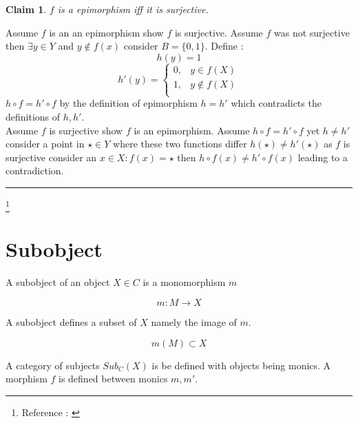 \documentclass[twoside]{article}
\newtheorem{claim}[theorem]{Claim}
\newenvironment{proof}{{\bf Proof:}}{\hfill\rule{2mm}{2mm}}
\begin{document}
\begin{figure}[H]
       \centering
{}
\end{figure}

\begin{claim}
  $f$ is a epimorphism iff it is surjective.
\end{claim}

\begin{proof}
  Assume $f$ is an an epimorphism show $f$ is surjective.  Assume $f$ was
  not surjective then $\exists y \in Y$ and $y \notin f(x)$ consider $B = \{ 0,1 \}$.
  Define :
  $$h(y)=1$$
  $$h'(y)=
  \begin{cases}
    0, & y \in f(X) \\
    1, & y \notin f(X) \\
  \end{cases}$$
  $h \circ f = h' \circ f$ by the definition of epimorphism $h = h'$ which contradicts
  the definitions of $h,h'$.\\

  Assume $f$ is surjective show $f$ is an epimorphism.  Assume $h \circ f = h' \circ f$
  yet $h \neq h'$ consider a point in $\star \in Y$ where these two functions differ
  $h(\star) \neq h'(\star)$ as $f$ is surjective consider an $x \in X : f(x) = \star$
  then $h \circ f(x) \neq h' \circ f(x)$ leading to a contradiction.
\end{proof}


\footnote{ Reference : \cite[Chapter~1.2]{popescu2012theory} \cite[p.~104]{spivak2014category} }

\section{Subobject}

A subobject of an object $X \in C$ is a monomorphism $m$

$$ m : M \rightarrow  X$$

A subobject defines a subset of $X$ namely the image of $m$.

$$ m(M) \subset X $$

A category of subjects $Sub_{C}(X)$ is be defined with objects
being monics. A morphism $f$ is defined between monics $m,m'$.

\begin{figure}[H]
       \centering
{}
\end{figure}
\end{document}
